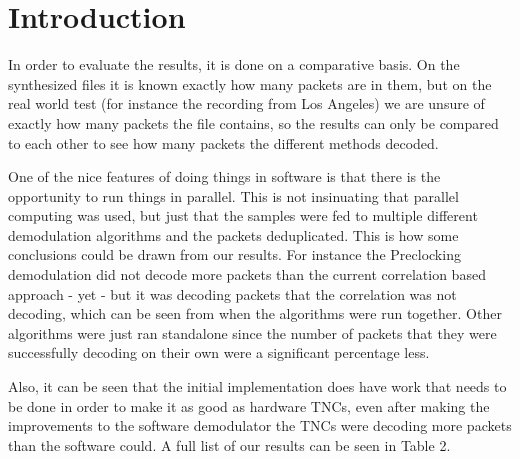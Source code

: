 \chapter{Introduction}

In order to evaluate the results, it is done on a comparative basis. On the synthesized files it is known exactly how many packets are in them, but on the real world test (for instance the recording from Los Angeles) we are unsure of exactly how many packets the file contains, so the results can only be compared to each other to see how many packets the different methods decoded.

One of the nice features of doing things in software is that there is the opportunity to run things in parallel. This is not insinuating that parallel computing was used, but just that the samples were fed to multiple different demodulation algorithms and the packets deduplicated. This is how some conclusions could be drawn from our results. For instance the Preclocking demodulation did not decode more packets than the current correlation based approach - yet - but it was decoding packets that the correlation was not decoding, which can be seen from when the algorithms were run together. Other algorithms were just ran standalone since the number of packets that they were successfully decoding on their own were a significant percentage less.

Also, it can be seen that the initial implementation does have work that needs to be done in order to make it as good as hardware TNCs, even after making the improvements to the software demodulator the TNCs were decoding more packets than the software could. A full list of our results can be seen in Table 2.
